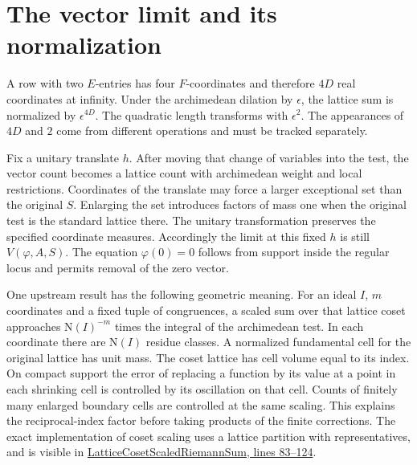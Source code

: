 \documentclass[12pt,letterpaper]{article}
\begin{document}
\section{The vector limit and its normalization}

A row with two $E$-entries has four $F$-coordinates and therefore $4D$ real coordinates at infinity. Under the archimedean dilation by $\epsilon$, the lattice sum is normalized by $\epsilon^{4D}$. The quadratic length transforms with $\epsilon^2$. The appearances of $4D$ and $2$ come from different operations and must be tracked separately.

Fix a unitary translate $h$. After moving that change of variables into the test, the vector count becomes a lattice count with archimedean weight and local restrictions. Coordinates of the translate may force a larger exceptional set than the original $S$. Enlarging the set introduces factors of mass one when the original test is the standard lattice there. The unitary transformation preserves the specified coordinate measures. Accordingly the limit at this fixed $h$ is still $V(\varphi,A,S)$. The equation $\varphi(0)=0$ follows from support inside the regular locus and permits removal of the zero vector.

One upstream result has the following geometric meaning. For an ideal $I$, $m$ coordinates and a fixed tuple of congruences, a scaled sum over that lattice coset approaches $\mathrm N(I)^{-m}$ times the integral of the archimedean test. In each coordinate there are $\mathrm N(I)$ residue classes. A normalized fundamental cell for the original lattice has unit mass. The coset lattice has cell volume equal to its index. On compact support the error of replacing a function by its value at a point in each shrinking cell is controlled by its oscillation on that cell. Counts of finitely many enlarged boundary cells are controlled at the same scaling. This explains the reciprocal-index factor before taking products of the finite corrections. The exact implementation of coset scaling uses a lattice partition with representatives, and is visible in \href{https://github.com/nousentllc/riemann-hypothesis/blob/40e56bab026552e089d7afcfeff08d2defb9c005/src/Development/AutomorphicSpectrum/Proofs/BlockDecomposition/LatticeCosetScaledRiemannSum.lean#L83-L124}{LatticeCosetScaledRiemannSum, lines 83--124}.
\end{document}
